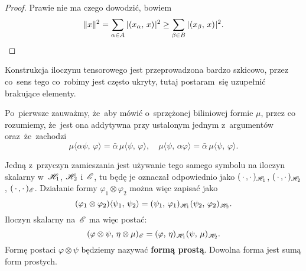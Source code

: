 \documentclass[a4paper,11pt]{article}
\begin{document}
\begin{proof}

  Prawie nie ma czego dowodzić, bowiem
  \begin{equation*}
    \label{eq:RS-Vol-I-s01-27}
    \lVert{  x  }\rVert^{ 2 } = \sum_{ \alpha \in A } | \hspace{0.05em}  ( x_{ \alpha }, \, x )  \hspace{0.05em} |^{ 2 }
    \geq \sum_{ \beta \in B } | \hspace{0.05em}  ( x_{ \beta }, \, x )  \hspace{0.05em} |^{ 2 }.
  \end{equation*}

\end{proof}

\vspace{\spaceFour}



\start {} Konstrukcja iloczynu tensorowego jest przeprowadzona
bardzo szkicowo, przez co~sens tego co~robimy jest często ukryty,
tutaj postaram~się uzupełnić brakujące elementy.

Po~pierwsze zauważmy, że~aby mówić o~sprzężonej biliniowej formie
$\mu$, przez co rozumiemy, że~jest ona addytywna przy ustalonym
jednym z~argumentów oraz~że~zachodzi
\begin{equation}
  \label{eq:RS-Vol-I-s01-28}
  \mu\langle \alpha \psi, \, \varphi \rangle = \bar{ \alpha } \, \mu\langle \psi, \, \varphi \rangle, \quad
  \mu\langle \psi, \, \alpha \varphi \rangle =
  \bar{ \alpha } \, \mu\langle \psi, \, \varphi \rangle.
\end{equation}

Jedną z~przyczyn zamieszania jest używanie tego samego symbolu na
iloczyn skalarny w~$\mathcal{H}_{ 1 }$, $\mathcal{H}_{ 2 }$ i~$\mathcal{E}$, tu będę je
oznaczał odpowiednio jako $( \, \cdot \,, \cdot \, )_{ \mathcal{H}_{ 1 } }$,
$( \, \cdot \,, \cdot \, )_{ \mathcal{H}_{ 2 } }$, $( \, \cdot \,, \cdot \, )_{ \mathcal{E} }$.
Działanie formy $\varphi_{ 1 } \otimes \varphi_{ 2 }$ można więc zapisać jako
\begin{equation}
  \label{eq:RS-Vol-I-s01-29}
  ( \varphi_{ 1 } \otimes \varphi_{ 2 } ) \langle \psi_{ 1 }, \, \psi_{ 2 } \rangle
  =
  ( \psi_{ 1 }, \, \varphi_{ 1 } )_{ \mathcal{H}_{ 1 } }
  ( \psi_{ 2 }, \, \varphi_{ 2 } )_{ \mathcal{H}_{ 2 } }.
\end{equation}
Iloczyn skalarny na~$\mathcal{E}$ ma więc postać:
\begin{equation}
  \label{eq:RS-Vol-I-s01-30}
  ( \varphi \otimes  \psi, \, \eta \otimes \mu )_{ \mathcal{E} }
  = ( \varphi, \, \eta )_{ \mathcal{H}_{ 1 } } ( \psi, \,  \mu )_{ \mathcal{H}_{ 2 } }.
\end{equation}
Formę postaci $\varphi \otimes \psi$ będziemy nazywać \textbf{formą prostą}.
Dowolna forma jest sumą form prostych.
\end{document}
